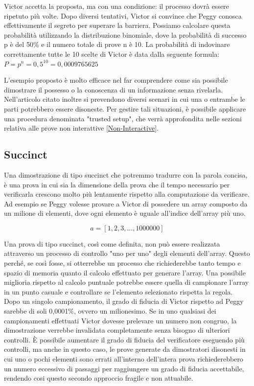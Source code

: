 Victor accetta la proposta, ma con una condizione: il processo dovrà essere
ripetuto più volte. Dopo diversi tentativi, Victor si convince che Peggy conosca effettivamente il segreto per superare
la barriera. Possiamo calcolare questa probabilità utilizzando la distribuzione binomiale, dove la probabilità di
successo p è del 50\% e il numero totale di prove n è 10. La probabilità di indovinare correttamente tutte le 10 scelte
di Victor è data dalla seguente formula: \(P = p^n = 0,5^{10} = 0,0009765625\)

L'esempio proposto è molto efficace nel far comprendere come sia possibile dimostrare il possesso o la conoscenza di un
informazione senza rivelarla. Nell’articolo citato inoltre si prevendono diversi scenari in cui una o entrambe le parti
potrebbero essere disoneste. Per gestire tali situazioni, è possibile applicare una procedura denominata "trusted
setup", che verrà approfondita nelle sezioni relativa alle prove non interattive \hyperref[sec:non-interactive]{[Non-Interactive]}.

\subsection{Succinct}
Una dimostrazione di tipo succinct che potremmo tradurre con la parola concisa, è una prova in cui sia la dimensione
della prova che il tempo necessario per verificarla crescono molto più lentamente rispetto alla computazione da
verificare. Ad esempio se Peggy volesse provare a Victor di possedere un array composto da un milione di elementi, dove
ogni elemento è uguale all’indice dell’array più uno.

\begin{equation}
a = [1,2,3,...,1000000]
\end{equation}

Una prova di tipo succinct, così come definita, non può essere realizzata attraverso un processo di controllo "uno per
uno" degli elementi dell'array. Questo perché, se così fosse, si otterrebbe un processo che richiederebbe tanto tempo e
spazio di memoria quanto il calcolo effettuato per generare l'array. Una possibile miglioria rispetto al calcolo puntuale
potrebbe essere quella di campionare l'array in un punto casuale e controllare se l'elemento selezionato rispetta la
regola. \\
Dopo un singolo campionamento, il grado di fiducia di Victor rispetto ad Peggy sarebbe di soli 0,0001\%, ovvero un
milionesimo. Se in uno qualsiasi dei campionamenti effettuati Victor dovesse prelevare un numero non congruo, la
dimostrazione verrebbe invalidata completamente senza bisogno di ulteriori controlli. È possibile aumentare il grado di
fiducia del verificatore eseguendo più controlli, ma anche in questo caso, le prove generate da dimostratori disonesti
in cui uno o pochi elementi sono errati all'interno dell'intera prova richiederebbero un numero eccessivo di passaggi
per raggiungere un grado di fiducia accettabile, rendendo cosi questo secondo approccio fragile e non attuabile.

